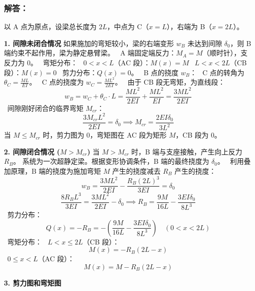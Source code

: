 \documentclass[11pt,a4paper]{ctexrep}
\begin{document}
{\subsubsection*{解答：}

以 A 点为原点，设梁总长度为 $2L$，中点为 C（$x=L$），右端为 B（$x=2L$）。

\textbf{1. 间隙未闭合情况}
如果施加的弯矩较小，梁的右端变形 $w_B$ 未达到间隙 $\delta_0$，则 B 端约束不起作用，梁为静定悬臂梁。
\noindent\textbullet\ A 端固定端反力：$M_A = M$（顺时针），支反力为 0。
\noindent\textbullet\ 弯矩分布：
\noindent\textbullet\ $0 < x < L$（AC 段）：$M(x) = M$
\noindent\textbullet\ $L < x < 2L$（CB 段）：$M(x) = 0$
\noindent\textbullet\ 剪力分布：$Q(x) = 0$。
\noindent\textbullet\ B 点的挠度 $w_B$：
\noindent\textbullet\ C 点的转角为 $\theta_C = \frac{ML}{EI}$。
\noindent\textbullet\ C 点的挠度为 $w_C = \frac{ML^2}{2EI}$。
\noindent\textbullet\ 由于 CB 段无弯矩，为直线段：
    \[
    w_B = w_C + \theta_C \cdot L = \frac{ML^2}{2EI} + \frac{ML^2}{EI} = \frac{3ML^2}{2EI}
    \]
\noindent\textbullet\ 间隙刚好闭合的临界弯矩 $M_{cr}$：
  \[
  \frac{3 M_{cr} L^2}{2 EI} = \delta_0 \implies M_{cr} = \frac{2 EI \delta_0}{3 L^2}
  \]
  当 $M \le M_{cr}$ 时，剪力图为 0，弯矩图在 AC 段为矩形 $M$，CB 段为 0。

\textbf{2. 间隙闭合情况 ($M > M_{cr}$)}
当 $M > M_{cr}$ 时，B 端与支座接触，产生向上反力 $R_B$。
系统为一次超静定梁。根据变形协调条件，B 端的最终挠度为 $\delta_0$。
\noindent\textbullet\ 利用叠加原理，B 端的挠度为施加弯矩 $M$ 产生的挠度减去 $R_B$ 产生的挠度：
  \[
  w_B = \frac{3ML^2}{2EI} - \frac{R_B (2L)^3}{3EI} = \delta_0
  \]
  \[
  \frac{8 R_B L^3}{3 EI} = \frac{3ML^2}{2EI} - \delta_0 \implies R_B = \frac{9M}{16L} - \frac{3EI \delta_0}{8L^3}
  \]
\noindent\textbullet\ 剪力分布：
  \[
  Q(x) = -R_B = -\left( \frac{9M}{16L} - \frac{3EI \delta_0}{8L^3} \right) \quad (0 < x < 2L)
  \]
\noindent\textbullet\ 弯矩分布：
\noindent\textbullet\ $L < x \le 2L$（CB 段）：
    \[
    M(x) = -R_B (2L - x)
    \]
\noindent\textbullet\ $0 \le x < L$（AC 段）：
    \[
    M(x) = M - R_B (2L - x)
    \]

\textbf{3. 剪力图和弯矩图}

\begin{figure}[H]
\centering
{}
\end{figure}}
\end{document}
